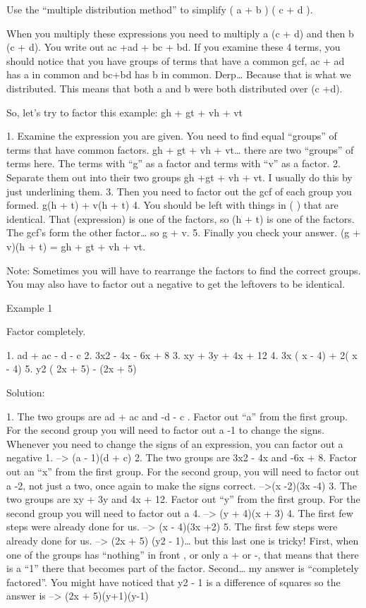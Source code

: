 Use the ``multiple distribution method'' to simplify ( a + b ) ( c + d ).

When you multiply these expressions you need to multiply a (c + d) and then b (c + d). You write out 
ac +ad + bc + bd. If you examine these 4 terms, you should notice that you have groups of terms that have a common gcf, ac + ad has a in common and bc+bd has b in common. Derp\ldots{} Because that is what we distributed. This means that both a and b were both distributed over (c +d).

So, let's try to factor this example: gh + gt + vh + vt 

1. Examine the expression you are given. You need to find equal ``groups'' of terms that have common factors. gh + gt + vh + vt\ldots{} there are two ``groups'' of terms here. The terms with ``g'' as a factor and terms with ``v'' as a factor.
2. Separate them out into their two groups gh +gt + vh + vt. I usually do this by just underlining them.
3. Then you need to factor out the gcf of each group you formed. g(h + t) + v(h + t)
4. You should be left with things in ( ) that are identical. That (expression) is one of the factors, so (h + t) is one of the factors. The gcf's form the other factor\ldots{} so g + v.
5. Finally you check your answer. (g + v)(h + t) = gh + gt + vh + vt.

Note: Sometimes you will have to rearrange the factors to find the correct groups. You may also have to factor out a negative to get the leftovers to be identical.

Example 1

Factor completely.

1. ad + ac - d - c
2. 3x2 - 4x - 6x + 8
3. xy + 3y + 4x + 12
4. 3x ( x - 4) + 2( x - 4)
5. y2 ( 2x + 5) - (2x + 5)

Solution:

1. The two groups are ad + ac and -d - c . Factor out ``a'' from the first group. For the second group you will need to factor out a -1 to change the signs. Whenever you need to change the signs of an expression, you can factor out a negative 1. --> (a - 1)(d + c) 
2. The two groups are 3x2 - 4x and -6x + 8. Factor out an ``x'' from the first group. For the second group, you will need to factor out a -2, not just a two, once again to make the signs correct. -->(x -2)(3x -4)
3. The two groups are xy + 3y and 4x + 12. Factor out ``y'' from the first group. For the second group you will need to factor out a 4. --> (y + 4)(x + 3)
4. The first few steps were already done for us. --> (x - 4)(3x +2)
5. The first few steps were already done for us. --> (2x + 5) (y2 - 1)\ldots{} but this last one is tricky! First, when one of the groups has ``nothing'' in front , or only a + or -, that means that there is a ``1'' there that becomes part of the factor. Second\ldots{} my answer is ``completely factored''. You might have noticed that y2 - 1 is a difference of squares so the answer is --> (2x + 5)(y+1)(y-1) 


